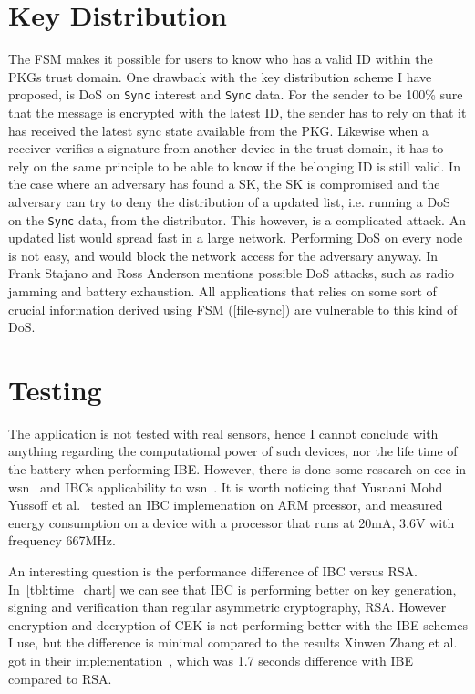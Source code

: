 \section{Key Distribution}
The \gls{FSM} makes it possible for users to know who has a valid \gls{ID} within the \gls{PKG}s trust domain.
One drawback with the key distribution scheme I have proposed, is \gls{DoS} on \texttt{Sync} \gls{interest} and \texttt{Sync} \gls{data}. 
For the sender to be 100\% sure that the message is encrypted with the latest \gls{ID}, the sender has to rely on that it has received the latest sync state available from the \gls{PKG}.
Likewise when a receiver verifies a signature from another device in the trust domain, it has to rely on the same principle to be able to know if the belonging \gls{ID} is still valid.
In the case where an adversary has found a \gls{SK}, the \gls{SK} is compromised and the adversary can try to deny the distribution of a updated list, i.e. running a \gls{DoS} on the \texttt{Sync} \gls{data}, from the distributor. 
This however, is a complicated attack.
An updated list would spread fast in a large network.
Performing \gls{DoS} on every node is not easy, and would block the network access for the adversary anyway.
In~\cite{DBLP:conf/spw/StajanoA99} Frank Stajano and Ross Anderson mentions possible \gls{DoS} attacks, such as radio jamming and battery exhaustion. 
All applications that relies on some sort of crucial information derived using \gls{FSM} (\autoref{file-sync}) are vulnerable to this kind of \gls{DoS}.

\section{Testing}
The application is not tested with real sensors, hence I cannot conclude with anything regarding the computational power of such devices, nor the life time of the battery when performing \gls{IBE}.
However, there is done some research on \gls{ecc} in \gls{wsn}~\cite{DBLP:conf/ipsn/LiuN08, DBLP:conf/ewsn/SzczechowiakOSCD08} and \gls{IBC}s applicability to \gls{wsn}~\cite{DBLP:journals/iacr/OliveiraAMDLD07}.
It is worth noticing that Yusnani Mohd Yussoff et al.~\cite{DBLP:journals/corr/abs-1207-6185} tested an \gls{IBC} implemenation on ARM prcessor, and measured energy consumption on a device with a processor that runs at 20mA, 3.6V with frequency 667MHz.

An interesting question is the performance difference of \gls{IBC} versus RSA.
In~\autoref{tbl:time_chart} we can see that \gls{IBC} is performing better on key generation, signing and verification than regular asymmetric cryptography, RSA. 
However encryption and decryption of \gls{CEK} is not performing better with the \gls{IBE} schemes I use, but the difference is minimal compared to the results Xinwen Zhang et al. got in their implementation~\cite{DBLP:conf/icnp/ZhangCXWSW11}, which was 1.7 seconds difference with \gls{IBE} compared to RSA.


